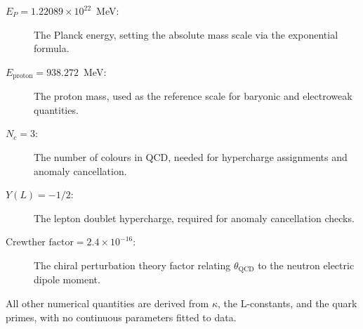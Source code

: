 \begin{description}
\item[\(E_P = 1.22089 \times 10^{22}\)~MeV:] The Planck energy, setting the
absolute mass scale via the exponential formula.
\item[\(E_{\text{proton}} = 938.272\)~MeV:] The proton mass, used as the
reference scale for baryonic and electroweak quantities.
\item[\(N_c = 3\):] The number of colours in QCD, needed for hypercharge
assignments and anomaly cancellation.
\item[\(Y(L) = -1/2\):] The lepton doublet hypercharge, required for anomaly
cancellation checks.
\item[\(\text{Crewther factor} = 2.4 \times 10^{-16}\):] The chiral
perturbation theory factor relating \(\theta_{\text{QCD}}\) to the neutron
electric dipole moment.
\end{description}

All other numerical quantities are derived from \(\kappa\), the L-constants,
and the quark primes, with no continuous parameters fitted to data.

